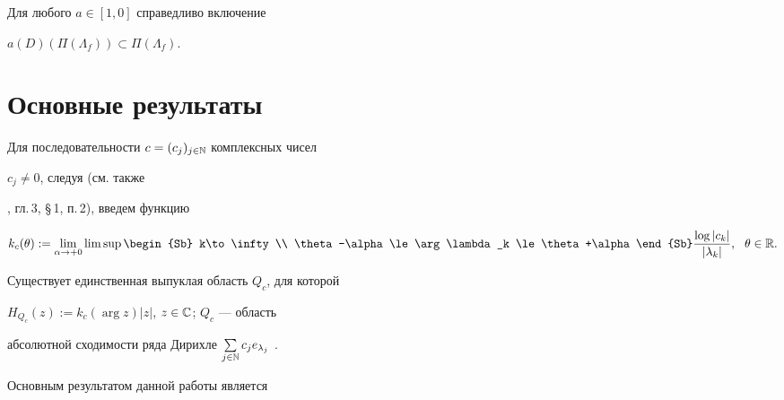 \begin{lem}


Для любого $a\in [1,0]$ справедливо включение


$a(D)(\Pi(\Lambda_f))\subset \Pi(\Lambda_f)$.


\end{lem}





\section{Основные результаты}





Для последовательности $c=(c_j)_{j\in\Bbb N}$ комплексных чисел


$c_j\ne 0$, следуя \cite{LUNC} (см. также


\cite{LEO}, гл.\,3, \S\,1, п.\,2), введем функцию


$$


k_c(\theta):=\lim\limits_{\alpha\to+0}


\limsup\limits \begin{Sb} k\to\infty \\ \theta-\alpha\le\arg \lambda_k


\le\theta+\alpha \end{Sb} \frac{\log |c_k|}{|\lambda_k|},\ \


\theta\in\Bbb R.


$$


Существует единственная выпуклая область $Q_c$, для которой


$H_{Q_c}(z):=k_c(\arg z )|z|$, $z\in\Bbb C$; $Q_c$ --- область


абсолютной сходимости ряда Дирихле $\sum\limits_{j\in\Bbb N}


c_je_{\lambda_j}$ \cite{LUNC}.





Основным результатом данной работы является





